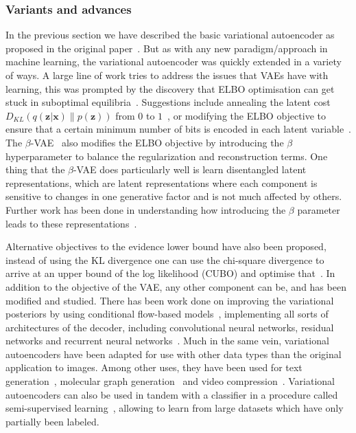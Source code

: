 \documentclass[final,3p,times,twocolumn]{elsarticle}
\begin{document}
\subsubsection{Variants and advances}
In the previous section we have described the basic variational autoencoder as proposed in the original paper~\cite{kingma2013auto}. But as with any new paradigm/approach in machine learning, the variational autoencoder was quickly extended in a variety of ways. A large line of work tries to address the issues that VAEs have with learning, this was prompted by the discovery that ELBO optimisation can get stuck in suboptimal equilibria~\cite{bowman2015generating}. Suggestions include annealing the latent cost $D_{K L}(q(\mathbf{z} | \mathbf{x}) \| p(\mathbf{z}))$ from $0$ to $1$~\cite{bowman2015generating}, or modifying the ELBO objective to ensure that a certain minimum number of bits is encoded in each latent variable~\cite{kingma2016improving}. The $\beta$-VAE~\cite{higgins2016beta} also modifies the ELBO objective by introducing the $\beta$ hyperparameter to balance the regularization and reconstruction terms. One thing that the $\beta$-VAE does particularly well is learn disentangled latent representations, which are latent representations where each component is sensitive to changes in one generative factor and is not much affected by others. Further work has been done in understanding how introducing the $\beta$ parameter leads to these representations~\cite{burgess2018understanding}. 

Alternative objectives to the evidence lower bound have also been proposed, instead of using the KL divergence one can use the chi-square divergence to arrive at an upper bound of the log likelihood (CUBO) and optimise that~\cite{dieng2016variational}. In addition to the objective of the VAE, any other component can be, and has been modified and studied. There has been work done on improving the variational posteriors by using conditional flow-based models~\cite{kingma2016improving, rezende2015variational}, implementing all sorts of architectures of the decoder, including convolutional neural networks, residual networks and recurrent neural networks~\cite{gregor2015draw}. 
Much in the same vein, variational autoencoders have been adapted for use with other data types than the original application to images. Among other uses, they have been used for text generation~\cite{semeniuta2017hybrid}, molecular graph generation~\cite{jin2018junction} and video compression~\cite{habibian2019video}. Variational autoencoders can also be used in tandem with a classifier in a procedure called semi-supervised learning~\cite{kingma2014semi}, allowing to learn from large datasets which have only partially been labeled. 
\end{document}
